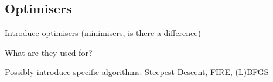 \subsection{Optimisers}
\label{sec:optimisers}

\bit
\item Introduce optimisers (minimisers, is there a difference)
\item What are they used for?
\item Possibly introduce specific algorithms: Steepest Descent, FIRE, (L)BFGS
\eit

\placeholder
